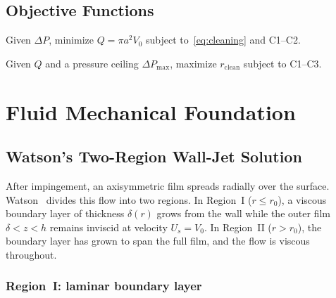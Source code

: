 \documentclass[aps,prfluids,reprint,amsmath,amssymb,floatfix]{revtex4-2}
\begin{document}
\subsection{Objective Functions}

\begin{description}[leftmargin=10pt]
\item[P1 (water minimization, fixed $\Delta P$):]
Given $\Delta P$, minimize $Q = \pi a^2 V_0$ subject to~\eqref{eq:cleaning}
and C1--C2.
\item[P2 (coverage maximization, fixed $Q$):]
Given $Q$ and a pressure ceiling $\Delta P_\mathrm{max}$, maximize
$r_\mathrm{clean}$ subject to C1--C3.
\end{description}

\section{Fluid Mechanical Foundation}
\label{sec:fluids}

\subsection{Watson's Two-Region Wall-Jet Solution}

After impingement, an axisymmetric film spreads radially over the surface.
Watson~\citep{Watson1964} divides this flow into two regions. In Region~I
($r \leq r_0$), a viscous boundary layer of thickness $\delta(r)$ grows
from the wall while the outer film $\delta < z < h$ remains inviscid at
velocity $U_s = V_0$. In Region~II ($r > r_0$), the boundary layer has
grown to span the full film, and the flow is viscous throughout.

\subsubsection{Region~I: laminar boundary layer}
\end{document}
